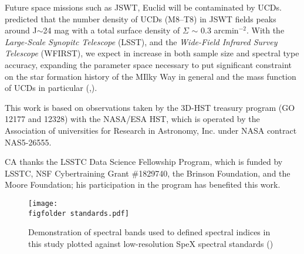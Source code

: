 \documentclass[manuscript]{aastex63}
\begin{document}
Future space missions such as JSWT, Euclid will be contaminated by UCDs. \cite{2016AJ....151...92R} predicted that the number density of UCDs (M8--T8) in JSWT fields peaks around J$\sim$24 mag with a total surface density of $\Sigma$ $\sim$ 0.3 arcmin$^{-2}$.  With the \textit{Large-Scale Synopitc Telescope} (LSST), and the \textit{Wide-Field Infrared Survey Telescope} (WFIRST), we expect in increase in both sample size and spectral type accuracy, expanding the parameter space necessary to put significant constraint on the star formation history of the MIlky Way in general and the mass function of UCDs in particular (\citealt{LSSTScienceCollaboration2009},\citealt{Spergel2015}).



\acknowledgements
This work is based on observations taken by the 3D-HST treasury program (GO 12177 and 12328) with the NASA/ESA HST, which is operated by the Association of universities for Research in Astronomy, Inc. under NASA contract NAS5-26555.

CA thanks the LSSTC Data Science Fellowship Program, which is funded by LSSTC, NSF Cybertraining Grant \#1829740, the Brinson Foundation, and the Moore Foundation; his participation in the program has benefited this work.


\clearpage




\newcommand{\figfolder}{/users/caganze/research/wisps/figures/}
\newcommand{\spectrafolder}{/Users/caganze/research/wisps/figures/ltwarfs/}


\begin{figure}
    \centering
    \texttt{[image: \\figfolder standards.pdf]}
    \caption{ Demonstration of spectral bands used to defined spectral indices in this study plotted against low-resolution SpeX spectral standards (\citealt{2010ApJS..190..100K}) }
    \label{fig:indexdefinition}
\end{figure}
\end{document}

